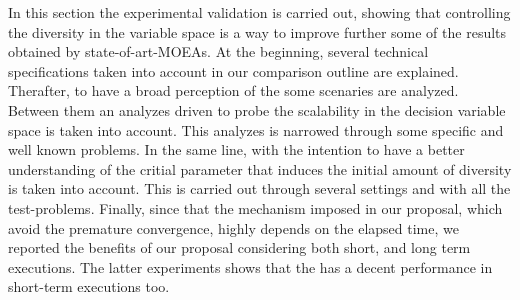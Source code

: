 In this section the experimental validation is carried out, showing that controlling the diversity in the variable space is a way to improve further some of the results obtained by state-of-art-MOEAs.
%
At the beginning, several technical specifications taken into account in our comparison outline are explained.
%
Therafter, to have a broad perception of the \VSDMOEA{} some scenaries are analyzed.
%
Between them an analyzes driven to probe the scalability in the decision variable space is taken into account.
%
This analyzes is narrowed through some specific and well known problems.
%
In the same line, with the intention to have a better understanding of the critial parameter that induces the initial amount of diversity is taken into account.
%
This is carried out through several settings and with all the test-problems.
%
Finally, since that the mechanism imposed in our proposal, which avoid the premature convergence, highly depends on the elapsed time, we reported the benefits of our proposal considering both short, and long term executions.
%
The latter experiments shows that the \VSDMOEA{} has a decent performance in short-term executions too.
%


